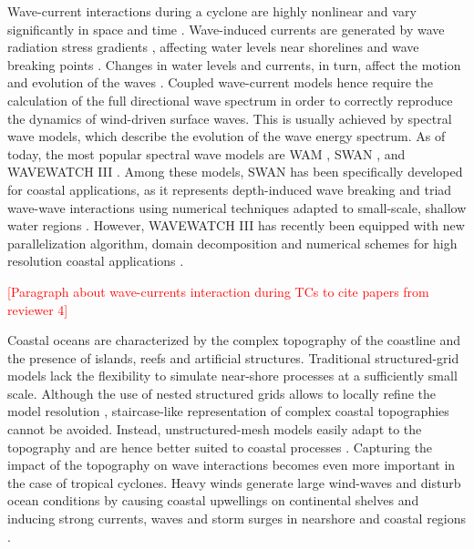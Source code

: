 \documentclass[preprint,12pt,authoryear]{elsarticle}
\begin{document}
Wave-current interactions during a cyclone are highly nonlinear and vary significantly in space and time \citep{wu2011fvcom}. Wave-induced currents are generated by wave radiation stress gradients \citep{longuet1970longshore}, affecting water levels near shorelines and wave breaking points \citep{longuet1964radiation}. Changes in water levels and currents, in turn, affect the motion and evolution of the waves \citep{sikiric2013coupling}. Coupled wave-current models hence require the calculation of the full directional wave spectrum in order to correctly reproduce the dynamics of wind-driven surface waves. This is usually achieved by spectral wave models, which describe the evolution of the wave energy spectrum. As of today, the most popular spectral wave models are WAM \citep{group1988wam}, %
SWAN \citep{booij1999third}, and WAVEWATCH III \citep{tolman2009user}. Among these models, SWAN has been specifically developed for coastal applications, as it represents depth-induced wave breaking and triad wave-wave interactions using numerical techniques adapted to small-scale, shallow water regions \citep{booij1999third}. However, WAVEWATCH III has recently been equipped with new parallelization algorithm, domain decomposition and numerical schemes for high resolution coastal applications \citep{ww3dg,abdolali2020large}.

\textcolor{red}{[Paragraph about wave-currents interaction during TCs to cite papers from reviewer 4]}

Coastal oceans are characterized by the complex topography of the coastline and the presence of islands, reefs and artificial structures. Traditional structured-grid models lack the flexibility to simulate near-shore processes at a sufficiently small scale. Although the use of nested structured grids allows to locally refine the model resolution \citep{warner2010development}, staircase-like representation of complex coastal topographies cannot be avoided. Instead, unstructured-mesh models easily adapt to the topography and are hence better suited to coastal processes \citep{fringer2019future}. Capturing the impact of the topography on wave interactions becomes even more important in the case of tropical cyclones. Heavy winds generate large wind-waves and disturb ocean conditions \citep{liu2020impacts} by causing coastal upwellings on continental shelves \citep{smith1982response} and inducing strong currents, waves and storm surges in nearshore and coastal regions \citep{dietrich2010high, weisberg2006hurricane}. 
\end{document}
